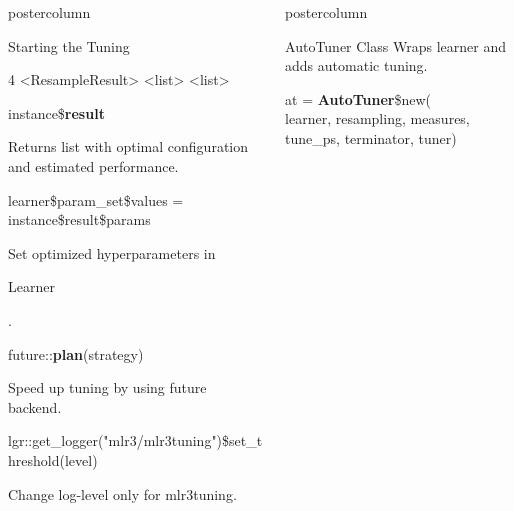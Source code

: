 \documentclass{beamer}
\newlength{\columnheight} %
\newcommand{\codeinline}[1]{\begin{codeboxinline}#1\end{codeboxinline}}
\begin{document}
\begin{frame}[fragile]{}
\begin{columns}
\begin{column}{.245\textwidth}
\begin{beamercolorbox}[center]{postercolumn}
\begin{minipage}{.98\textwidth}
{\begin{myblock}{Starting the Tuning}
\begin{codeboxmultiline}[width=27cm]
{									\phantom{n}4 \space\space\space\space\space{} \space\space <ResampleResult> \space\space\space{} <list> <list> \space 0.2721586}
							\end{codeboxmultiline}
							\vspace{1em}
							\begin{codebox}
								instance\$\textbf{result}
							\end{codebox}
							Returns list with optimal configuration and estimated performance.
							\\
							\begin{codebox}
								{\footnotesize learner\$param\_set\$values = instance\$result\$params}
							\end{codebox}
							Set optimized hyperparameters in \codeinline{Learner}.
							\\
							\begin{codebox}
								future::\textbf{plan}(strategy)
							\end{codebox}
							Speed up tuning by using future backend.
							\\
							\begin{codebox}
								{\scriptsize lgr::get\_logger("mlr3/mlr3tuning")\$set\_threshold(level)}
							\end{codebox}
							Change log-level only for mlr3tuning.
						\end{myblock}
						\vfill}
				\end{minipage}
			\end{beamercolorbox}
		\end{column}
		\begin{column}{.245\textwidth}
			\begin{beamercolorbox}[center]{postercolumn}
				\begin{minipage}{.98\textwidth}
					\parbox[t][\columnheight]{\textwidth}{
						\begin{myblock}{AutoTuner Class}
							Wraps learner and adds automatic tuning. 
							\\
							\begin{codeboxmultiline}[width=20cm]
								at = \textbf{AutoTuner}\$new(\\
								\hspace*{1ex}learner, resampling, measures, \\
								\hspace*{1ex}tune\_ps, terminator, tuner)
							\end{codeboxmultiline}

\end{myblock}}
\end{minipage}
\end{beamercolorbox}
\end{column}
\end{columns}
\end{frame}
\end{document}
